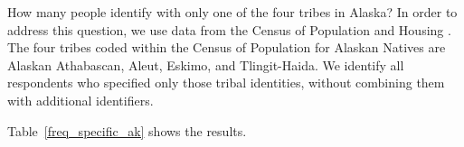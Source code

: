 \documentclass[dvipsnames,12pt,titlepage]{article}
\author{Lars Vilhuber}
\title{\mytitle}
\date{\today}
\begin{document}
	 \maketitle
	 \begin{abstract}
	 	We discuss identification with tribes in  Alaska.
	 \end{abstract}
	 \thispagestyle{empty}
	 
	 How many people identify with only one of the four tribes in Alaska?  In order to address this question, we use data from the Census of Population and Housing \citep{10.3886/icpsr13568.v1}. The four tribes coded within the Census of Population for Alaskan Natives are Alaskan Athabascan, Aleut, Eskimo, and Tlingit-Haida. We identify all respondents who specified only those tribal identities, without combining them with additional identifiers.
	 
	 Table~\ref{freq_specific_ak} shows the results.
	 
	 
	 
	 
\end{document}
